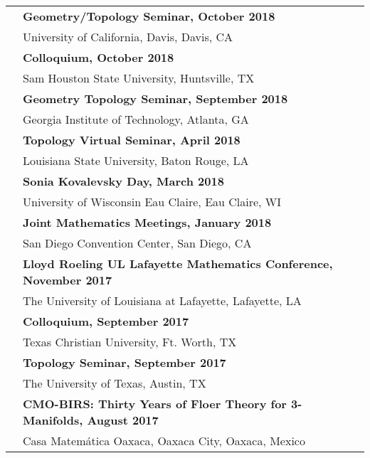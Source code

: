 \documentclass[letterpaper,11pt,oneside]{article}
\begin{document}
          \noindent \begin{tabular}{@{} l l l}  
       
       & \textbf{Geometry/Topology Seminar, October 2018} \\
     & University of California, Davis, Davis, CA\\
     


        & \textbf{Colloquium, October 2018 } \\
     & Sam Houston State University, Huntsville, TX\\
 
       & \textbf{Geometry Topology Seminar, September 2018} \\
     & Georgia Institute of Technology, Atlanta, GA\\

       & \textbf{Topology Virtual Seminar, April 2018 } \\
     & Louisiana State University, Baton Rouge, LA\\
     
            & \textbf{Sonia Kovalevsky Day, March 2018 } \\
     & University of Wisconsin Eau Claire, Eau Claire, WI\\
   


     &\textbf{Joint Mathematics Meetings, January 2018} \\
     &  San Diego Convention Center, San Diego, CA\\

     &\textbf{Lloyd Roeling UL Lafayette Mathematics Conference, November 2017} \\

     &  The University of Louisiana at Lafayette, Lafayette, LA \\


    
     
        
    
     &\textbf{Colloquium, September 2017} \\
     & Texas Christian University, Ft. Worth, TX \\
 
     


     &\textbf{Topology Seminar, September 2017} \\
     &  The University of Texas, Austin, TX \\
 
 

     &\textbf{CMO-BIRS: Thirty Years of Floer Theory for 3-Manifolds, August 2017 } \\
     &  Casa Matem\'{a}tica Oaxaca, Oaxaca City, Oaxaca, Mexico\\


\end{tabular}
\end{document}
